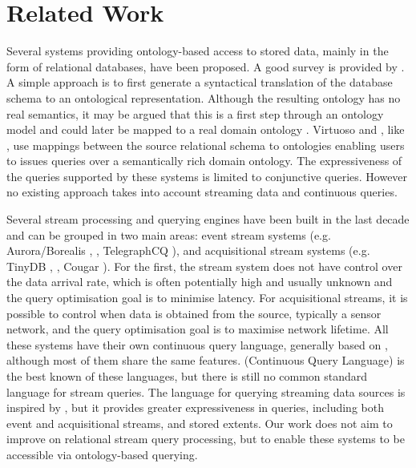 \section{Related Work}
\label{sec:related-work}

Several systems providing ontology-based access to stored data, mainly in the form of relational databases, have been proposed.
A good survey is provided by \cite{Sahoo_09}.
A simple approach is to first generate a syntactical translation of the database schema to an ontological representation. 
Although the resulting ontology has no real semantics, it may be argued that this is a first step through an ontology model and could later be mapped to a real domain ontology \cite{Lubyte_09}.
Virtuoso \cite{Erling_07} and \dtworq  \cite{Bizer_07}, like \rtwoo, use mappings between the source relational schema to \rdf ontologies enabling users to issues queries over a semantically rich domain ontology.
The expressiveness of the queries supported by these systems is limited to conjunctive queries. 
However no existing approach takes into account streaming data and continuous queries.

Several stream processing and querying engines have been built in the last decade and can be grouped in two main areas: event stream systems (e.g. Aurora/Borealis \cite{Abadi_2005}, \stream \cite{Arasu_06a}, TelegraphCQ \cite{Chandrasekaran_03}), and acquisitional stream systems (e.g. TinyDB \cite{Madden_05}, \snee \cite{Galpin_09}, Cougar \cite{Yao_02}). 
For the first, the stream system does not have control over the data arrival rate, which is often potentially high and usually unknown and the query optimisation goal is to minimise latency. 
For acquisitional streams, it is possible to control when data is obtained from the source, typically a sensor network, and the query optimisation goal is to maximise network lifetime. 
All these systems have their own continuous query language, generally based on \sql, although most of them share the same features. 
\cql (Continuous Query Language) \cite{Arasu_2006} is the best known of these languages, but  there is still no common standard  language for stream queries. 
The \sneeql\cite{Brenninkmeijer_08} language for querying streaming data sources is inspired by \cql, but it provides greater expressiveness in queries, including both event and acquisitional streams, and stored extents.
Our work does not aim to improve on relational stream query processing, but to enable these systems to be accessible via ontology-based querying.

